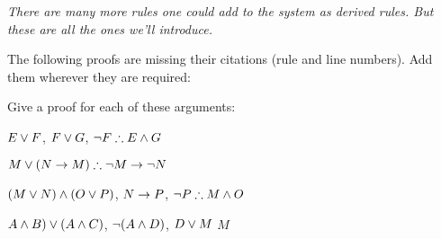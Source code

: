 \emph{There are many more rules one could add to the system as derived rules. But these are all the ones we'll introduce.}
\newpage
\begin{practiceproblems}
\solutions
\problempart
\label{pr.justifyTFLproof}
The following proofs are missing their citations (rule and line numbers). Add them wherever they are required:
\begin{multicols}{2}
\begin{fitchproof}
 {}
 {}
\end{fitchproof}
%
\vfill
%
\begin{fitchproof}
\open
\close
\end{fitchproof}
%
\columnbreak
%
\begin{fitchproof}
\open
\close
{}
\open
\close
{}
\end{fitchproof}
\end{multicols}

\problempart
Give a proof for each of these arguments:
\begin{earg}
\item $E\vee F$, $F\vee G$, $\enot F \therefore E \eand G$
\item $M\eor(N\eif M) \therefore \enot M \eif \enot N$
\item $(M \vee N) \mathbin{\wedge} (O \vee P)$, $N \rightarrow P$, $\enot P \therefore M\eand O$
\item $A\mathbin{\wedge} B)\vee(A\mathbin{\wedge} C)$, $\neg(A\mathbin{\wedge} D)$, $D\vee M$ \therefore $M$
\end{earg}



\end{practiceproblems}

